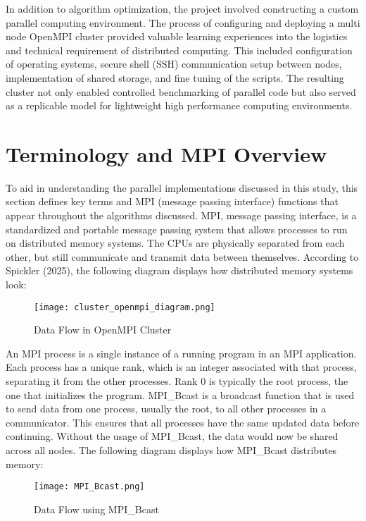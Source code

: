 \documentclass[12pt]{article}
\begin{document}
In addition to algorithm optimization, the project involved constructing a custom parallel computing environment. The process of configuring and deploying a multi node OpenMPI cluster provided valuable learning experiences into the logistics and technical requirement of distributed computing. This included configuration of operating systems, secure shell (SSH)  communication setup between nodes, implementation of shared storage, and fine tuning of the scripts. The resulting cluster not only enabled controlled benchmarking of parallel code but also served as a replicable model for lightweight high performance computing environments.

\section{Terminology and MPI Overview}
To aid in understanding the parallel implementations discussed in this study, this section defines key terms and MPI (message passing interface) functions that appear throughout the algorithms discussed. MPI, message passing interface, is a standardized and portable message passing system that allows processes to run on distributed memory systems. The CPUs are physically separated from each other, but still communicate and transmit data between themselves. According to Spickler (2025), the following diagram displays how distributed memory systems look:

\begin{figure}[H]
    \centering
    \texttt{[image: cluster\_openmpi\_diagram.png]}
    \caption{Data Flow in OpenMPI Cluster}
    \label{fig:mpi_diagram}
\end{figure}

An MPI process is a single instance of a running program in an MPI application. Each process has a unique rank, which is an integer associated with that process, separating it from the other processes. Rank 0 is typically the root process, the one that initializes the program. MPI\_Bcast is a broadcast function that is used to send data from one process, usually the root, to all other processes in a communicator. This ensures that all processes have the same updated data before continuing. Without the usage of MPI\_Bcast, the data would now be shared across all nodes. The following diagram displays how MPI\_Bcast distributes memory:

\begin{figure}[H]
    \centering
    \texttt{[image: MPI\_Bcast.png]}
    \caption{Data Flow using MPI\_Bcast}
    \label{fig:mpi_bcast}
\end{figure}
\end{document}
